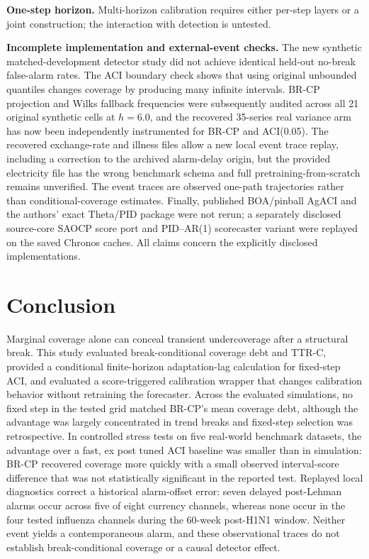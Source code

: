 \documentclass[10pt]{article}
\newcommand{\brcp}{\textsc{BR-CP}}
\begin{document}
\textbf{One-step horizon.} Multi-horizon calibration requires either per-step
layers or a joint construction; the interaction with detection is untested.

\textbf{Incomplete implementation and external-event checks.} The new
synthetic matched-development detector study did not achieve identical
held-out no-break false-alarm rates. The ACI boundary check shows that using
original unbounded quantiles changes coverage by producing many infinite
intervals. BR-CP projection and Wilks fallback frequencies were subsequently audited across
all 21 original synthetic cells at $h=6.0$, and the recovered 35-series real variance arm has now been independently
instrumented for BR-CP and ACI(0.05). The recovered exchange-rate and illness files allow a new local event trace
replay, including a correction to the archived alarm-delay origin, but the
provided electricity file has the wrong benchmark schema and full
pretraining-from-scratch remains unverified. The event traces are observed
one-path trajectories rather than conditional-coverage estimates. Finally,
published BOA/pinball AgACI and the authors' exact Theta/PID package
were not rerun; a separately disclosed source-core SAOCP score port and
PID--AR(1) scorecaster variant were replayed on the saved Chronos caches.
All claims concern the explicitly disclosed implementations.

\section{Conclusion}

Marginal coverage alone can conceal transient undercoverage after a structural break. This study evaluated break-conditional coverage debt and TTR-C, provided a conditional finite-horizon adaptation-lag calculation for fixed-step ACI, and evaluated a score-triggered calibration wrapper that changes calibration behavior without retraining the forecaster. Across the evaluated simulations, no fixed step in the tested grid matched \brcp{}'s mean coverage debt, although the advantage was largely concentrated in trend breaks and fixed-step selection was retrospective. In controlled stress tests on five real-world benchmark datasets, the advantage over a fast, ex post tuned ACI baseline was smaller than in simulation: \brcp{} recovered coverage more quickly with a small observed interval-score difference that was not statistically significant in the reported test. Replayed local diagnostics correct a historical alarm-offset error: seven delayed post-Lehman alarms occur across five of eight currency channels, whereas none occur in the four tested influenza channels during the 60-week post-H1N1 window. Neither event yields a contemporaneous alarm, and these observational traces do not establish break-conditional coverage or a causal detector effect.
\end{document}
